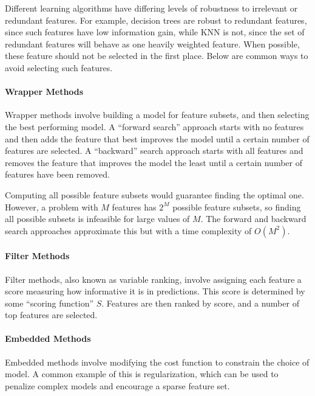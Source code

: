 \documentclass[12pt]{article}
\begin{document}
            Different learning algorithms have differing levels of robustness to irrelevant or redundant features. For
            example, decision trees are robust to redundant features, since such features have low information gain,
            while KNN is not, since the set of redundant features will behave as one heavily weighted feature. When
            possible, these feature should not be selected in the first place. Below are common ways to avoid selecting
            such features.

            \paragraph{Wrapper Methods}
            Wrapper methods involve building a model for feature subsets, and then selecting the best performing model.
            A ``forward search'' approach starts with no features and then adds the feature that best improves the model
            until a certain number of features are selected.  A ``backward'' search approach starts with all features
            and removes the feature that improves the model the least until a certain number of features have been
            removed.

            Computing all possible feature subsets would guarantee finding the optimal one. However, a problem with $M$
            features has $2^M$ possible feature subsets, so finding all possible subsets is infeasible for large values
            of $M$. The forward and backward search approaches approximate this but with a time complexity of $O(M^2)$.

            \paragraph{Filter Methods}
            Filter methods, also known as variable ranking, involve assigning each feature a score measuring how
            informative it is in predictions. This score is determined by some ``scoring function'' $S$. Features are
            then ranked by score, and a number of top features are selected.

            \paragraph{Embedded Methods}
            Embedded methods involve  modifying the cost function to constrain the choice of model. A common example of
            this is regularization, which can be used to penalize complex models and encourage a sparse feature set.
\end{document}
